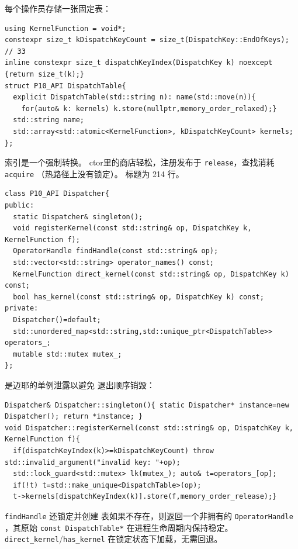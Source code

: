 每个操作员存储一张固定表：

\begin{lstlisting}[caption={33 atomics per operator.}, label=lst:dispatchtable]
using KernelFunction = void*;
constexpr size_t kDispatchKeyCount = size_t(DispatchKey::EndOfKeys); // 33
inline constexpr size_t dispatchKeyIndex(DispatchKey k) noexcept {return size_t(k);}
struct P10_API DispatchTable{
  explicit DispatchTable(std::string n): name(std::move(n)){
    for(auto& k: kernels) k.store(nullptr,memory_order_relaxed);}
  std::string name;
  std::array<std::atomic<KernelFunction>, kDispatchKeyCount> kernels;
};
\end{lstlisting}

索引是一个强制转换。 ctor里的商店轻松，注册发布于
\texttt{release}，查找消耗 \texttt{acquire} （热路径上没有锁定）。
标题为 214 行。

\begin{lstlisting}[caption={registry map.}, label=lst:registermap]
class P10_API Dispatcher{
public:
  static Dispatcher& singleton();
  void registerKernel(const std::string& op, DispatchKey k, KernelFunction f);
  OperatorHandle findHandle(const std::string& op);
  std::vector<std::string> operator_names() const;
  KernelFunction direct_kernel(const std::string& op, DispatchKey k) const;
  bool has_kernel(const std::string& op, DispatchKey k) const;
private:
  Dispatcher()=default;
  std::unordered_map<std::string,std::unique_ptr<DispatchTable>> operators_;
  mutable std::mutex mutex_;
};
\end{lstlisting}

是迈耶的单例泄露以避免
退出顺序销毁：

\begin{lstlisting}[caption={singleton.}, label=lst:singleton]
Dispatcher& Dispatcher::singleton(){ static Dispatcher* instance=new Dispatcher(); return *instance; }
void Dispatcher::registerKernel(const std::string& op, DispatchKey k, KernelFunction f){
  if(dispatchKeyIndex(k)>=kDispatchKeyCount) throw std::invalid_argument("invalid key: "+op);
  std::lock_guard<std::mutex> lk(mutex_); auto& t=operators_[op];
  if(!t) t=std::make_unique<DispatchTable>(op);
  t->kernels[dispatchKeyIndex(k)].store(f,memory_order_release);}
\end{lstlisting}

\texttt{findHandle} 还锁定并创建
表如果不存在，则返回一个非拥有的 \texttt{OperatorHandle} ，其原始
\texttt{const DispatchTable*} 在进程生命周期内保持稳定。
\texttt{direct\_kernel}/\texttt{has\_kernel} 在锁定状态下加载，无需回退。

